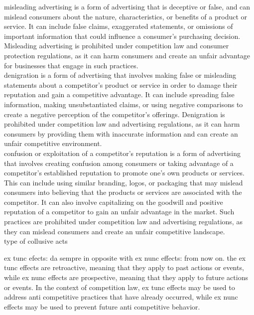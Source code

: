 \documentclass[12pt,a4paper]{report}
\begin{document}
misleading advertising is a form of advertising that is deceptive or false, and can mislead consumers about the nature, characteristics, or benefits of a product or service. It can include false claims, exaggerated statements, or omissions of important information that could influence a consumer's purchasing decision. Misleading advertising is prohibited under competition law and consumer protection regulations, as it can harm consumers and create an unfair advantage for businesses that engage in such practices.
\\ denigration is a form of advertising that involves making false or misleading statements about a competitor's product or service in order to damage their reputation and gain a competitive advantage. It can include spreading false information, making unsubstantiated claims, or using negative comparisons to create a negative perception of the competitor's offerings. Denigration is prohibited under competition law and advertising regulations, as it can harm consumers by providing them with inaccurate information and can create an unfair competitive environment.
\\ confusion or exploitation of a competitor's reputation is a form of advertising that involves creating confusion among consumers or taking advantage of a competitor's established reputation to promote one's own products or services. This can include using similar branding, logos, or packaging that may mislead consumers into believing that the products or services are associated with the competitor. It can also involve capitalizing on the goodwill and positive reputation of a competitor to gain an unfair advantage in the market. Such practices are prohibited under competition law and advertising regulations, as they can mislead consumers and create an unfair competitive landscape.
\\ type of collusive acts

ex tunc efects: da sempre in opposite with ex nunc effects: from now on. the ex tunc effects are retroactive, meaning that they apply to past actions or events, while ex nunc effects are prospective, meaning that they apply to future actions or events. In the context of competition law, ex tunc effects may be used to address anti competitive practices that have already occurred, while ex nunc effects may be used to prevent future anti competitive behavior.
\end{document}
